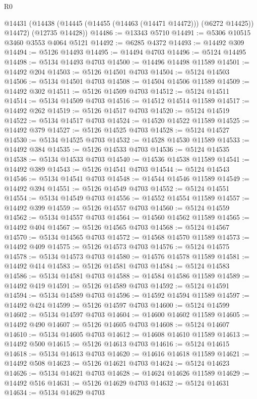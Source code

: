 \begin{lexlean}{R0}
\begin{coremodule}
    @14431
      (@14438 (@14445 (@14455 (@14463 (@14471 @14472))) (@6272 @14425)) @14472)
      (@12735 @14428))
@14486 := @13343 @5710
@14491 := @5306 @10515 @3460 @3553 @4064 @5121
@14492 := @6285 @4372
@14493 := @14492 @309
@14494 := @5126 @14493
@14495 := @14494 @4703
@14496 := @5124 @14495
@14498 := @5134 @14493 @4703
@14500 := @14496 @14498 @11589
@14501 := @14492 @204
@14503 := @5126 @14501 @4703
@14504 := @5124 @14503
@14506 := @5134 @14501 @4703
@14508 := @14504 @14506 @11589
@14509 := @14492 @302
@14511 := @5126 @14509 @4703
@14512 := @5124 @14511
@14514 := @5134 @14509 @4703
@14516 := @14512 @14514 @11589
@14517 := @14492 @262
@14519 := @5126 @14517 @4703
@14520 := @5124 @14519
@14522 := @5134 @14517 @4703
@14524 := @14520 @14522 @11589
@14525 := @14492 @379
@14527 := @5126 @14525 @4703
@14528 := @5124 @14527
@14530 := @5134 @14525 @4703
@14532 := @14528 @14530 @11589
@14533 := @14492 @384
@14535 := @5126 @14533 @4703
@14536 := @5124 @14535
@14538 := @5134 @14533 @4703
@14540 := @14536 @14538 @11589
@14541 := @14492 @389
@14543 := @5126 @14541 @4703
@14544 := @5124 @14543
@14546 := @5134 @14541 @4703
@14548 := @14544 @14546 @11589
@14549 := @14492 @394
@14551 := @5126 @14549 @4703
@14552 := @5124 @14551
@14554 := @5134 @14549 @4703
@14556 := @14552 @14554 @11589
@14557 := @14492 @399
@14559 := @5126 @14557 @4703
@14560 := @5124 @14559
@14562 := @5134 @14557 @4703
@14564 := @14560 @14562 @11589
@14565 := @14492 @404
@14567 := @5126 @14565 @4703
@14568 := @5124 @14567
@14570 := @5134 @14565 @4703
@14572 := @14568 @14570 @11589
@14573 := @14492 @409
@14575 := @5126 @14573 @4703
@14576 := @5124 @14575
@14578 := @5134 @14573 @4703
@14580 := @14576 @14578 @11589
@14581 := @14492 @414
@14583 := @5126 @14581 @4703
@14584 := @5124 @14583
@14586 := @5134 @14581 @4703
@14588 := @14584 @14586 @11589
@14589 := @14492 @419
@14591 := @5126 @14589 @4703
@14592 := @5124 @14591
@14594 := @5134 @14589 @4703
@14596 := @14592 @14594 @11589
@14597 := @14492 @424
@14599 := @5126 @14597 @4703
@14600 := @5124 @14599
@14602 := @5134 @14597 @4703
@14604 := @14600 @14602 @11589
@14605 := @14492 @490
@14607 := @5126 @14605 @4703
@14608 := @5124 @14607
@14610 := @5134 @14605 @4703
@14612 := @14608 @14610 @11589
@14613 := @14492 @500
@14615 := @5126 @14613 @4703
@14616 := @5124 @14615
@14618 := @5134 @14613 @4703
@14620 := @14616 @14618 @11589
@14621 := @14492 @508
@14623 := @5126 @14621 @4703
@14624 := @5124 @14623
@14626 := @5134 @14621 @4703
@14628 := @14624 @14626 @11589
@14629 := @14492 @516
@14631 := @5126 @14629 @4703
@14632 := @5124 @14631
@14634 := @5134 @14629 @4703

\end{coremodule}
\end{lexlean}
